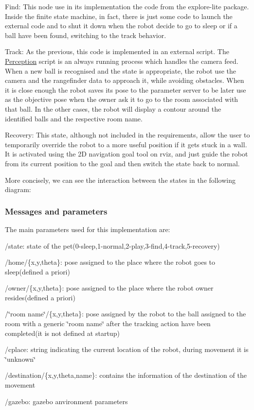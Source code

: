 \begin{DoxyItemize}
\item Find\+: This node use in its implementation the code from the explore-\/lite package. Inside the finite state machine, in fact, there is just some code to launch the external code and to shut it down when the robot decide to go to sleep or if a ball have been found, switching to the track behavior.
\item Track\+: As the previous, this code is implemented in an external script. The \hyperlink{namespacePerception}{Perception} script is an always running process which handles the camera feed. When a new ball is recognised and the state is appropriate, the robot use the camera and the rangefinder data to approach it, while avoiding obstacles. When it is close enough the robot saves its pose to the parameter server to be later use as the objective pose when the owner ask it to go to the room associated with that ball. In the other cases, the robot will display a contour around the identified balls and the respective room name.
\item Recovery\+: This state, although not included in the requirements, allow the user to temporarily override the robot to a more useful position if it gets stuck in a wall. It is activated using the 2D navigation goal tool on rviz, and just guide the robot from its current position to the goal and then switch the state back to normal.
\end{DoxyItemize}

More concisely, we can see the interaction between the states in the following diagram\+:

\subsubsection*{Messages and parameters}

The main parameters used for this implementation are\+:
\begin{DoxyItemize}
\item /state\+: state of the pet(0-\/sleep,1-\/normal,2-\/play,3-\/find,4-\/track,5-\/recovery)
\item /home/\{x,y,theta\}\+: pose assigned to the place where the robot goes to sleep(defined a priori)
\item /owner/\{x,y,theta\}\+: pose assigned to the place where the robot owner resides(defined a priori)
\item /\char`\"{}room name\char`\"{}/\{x,y,theta\}\+: pose assigned by the robot to the ball assigned to the room with a generic \char`\"{}room name\char`\"{} after the tracking action have been completed(it is not defined at startup)
\item /cplace\+: string indicating the current location of the robot, during movement it is \char`\"{}unknown\char`\"{}
\item /destination/\{x,y,theta,name\}\+: contains the information of the destination of the movement
\item /gazebo\+: gazebo anvironment parameters
\end{DoxyItemize}

